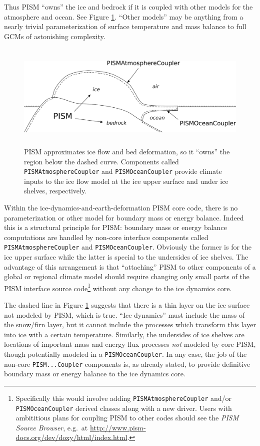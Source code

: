 \documentclass[11pt,final]{amsart}
\renewcommand{\t}[1]{\texttt{#1}}
\begin{document}
Thus PISM ``owns'' the ice and bedrock if it is coupled with other models for the atmosphere and ocean.  See Figure \ref{fig:climatecartoon}.  ``Other models'' may be anything from a nearly trivial parameterization of surface temperature and mass balance to full GCMs of astonishing complexity.

\begin{figure}[ht]
\vspace{0.2in}
\includegraphics[height=2.0in,keepaspectratio=true]{figs/climate_cartoon}

\vspace{0.1in}
\caption{PISM approximates ice flow and bed deformation, so it ``owns'' the region below the dashed curve.  Components called \t{PISMAtmosphereCoupler} and \t{PISMOceanCoupler} provide climate inputs to the ice flow model at the ice upper surface and under ice shelves, respectively.}
\label{fig:climatecartoon}
\end{figure}

Within the ice-dynamics-and-earth-deformation PISM core code, there is no parameterization or other model for boundary mass or energy balance.  Indeed this is a structural principle for PISM: boundary mass or energy balance computations are handled by non-core interface components called \t{PISMAtmosphereCoupler} and \t{PISMOceanCoupler}.   Obviously the former is for the ice upper surface while the latter is special to the undersides of ice shelves.  The advantage of this arrangement is that ``attaching'' PISM to other components of a global or regional climate model should require changing only small parts of the PISM interface source code\footnote{Specifically this would involve adding \t{PISMAtmosphereCoupler} and/or \t{PISMOceanCoupler} derived classes along with a new driver.  Users with ambititious plans for coupling PISM to other codes should see the \emph{PISM Source Browser}, e.g.~at \url{http://www.pism-docs.org/dev/doxy/html/index.html}.} without any change to the ice dynamics core.

The dashed line in Figure \ref{fig:climatecartoon} suggests that there is a thin layer on the ice surface not modeled by PISM, which is true.  ``Ice dynamics'' must include the mass of the snow/firn layer, but it cannot include the processes which transform this layer into ice with a certain temperature.  Similarly, the undersides of ice shelves are locations of important mass and energy flux processes \emph{not} modeled by core PISM, though potentially modeled in a \t{PISMOceanCoupler}.  In any case, the job of the non-core \t{PISM...Coupler} components is, as already stated, to provide definitive boundary mass or energy balance to the ice dynamics core.
\end{document}
